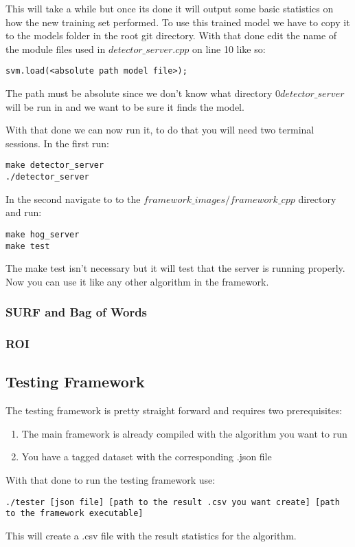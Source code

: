 \documentclass[letterpaper,10pt,titlepage]{article}
\begin{document}
This will take a while but once its done it will output some basic statistics 
on how the new training set performed. To use this trained model we have to copy it
to the models folder in the root git directory. With that done edit the name of the
module files used in $detector\_server.cpp$ on line 10 like so:
\begin{lstlisting}
svm.load(<absolute path model file>); 
\end{lstlisting}


The path must be absolute since we don't know what directory $0detector\_server$ will
be run in and we want to be sure it finds the model.

With that done we can now run it, to do that you will need two terminal sessions.
In the first run:
\begin{lstlisting}
make detector_server
./detector_server 
\end{lstlisting}

In the second navigate to to the $framework\_images/framework\_cpp$ directory and run:
\begin{lstlisting}
make hog_server
make test
\end{lstlisting}
The make test isn't necessary but it will test that the server is running properly.
Now you can use it like any other algorithm in the framework.

\subsubsection*{SURF and Bag of Words}

\subsubsection*{ROI}

\subsection*{Testing Framework}

The testing framework is pretty straight forward and requires two prerequisites:
\begin{enumerate}
    \item The main framework is already compiled with the algorithm you want to run
    \item You have a tagged dataset with the corresponding .json file 
\end{enumerate}
With that done to run the testing framework use:
\begin{lstlisting}
./tester [json file] [path to the result .csv you want create] [path to the framework executable]
\end{lstlisting}
This will create a .csv file with the result statistics for the algorithm.
\end{document}
